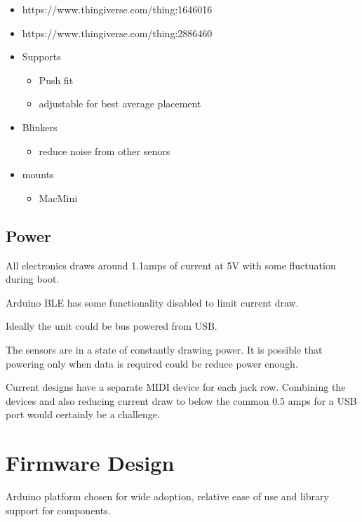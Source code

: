 \begin{itemize}
\item
  https://www.thingiverse.com/thing:1646016
\item
  https://www.thingiverse.com/thing:2886460
\item
  Supports

  \begin{itemize}
  \tightlist
  \item
    Push fit
  \item
    adjustable for best average placement
  \end{itemize}
\item
  Blinkers

  \begin{itemize}
  \tightlist
  \item
    reduce noise from other senors
  \end{itemize}
\item
  mounts

  \begin{itemize}
  \tightlist
  \item
    MacMini
  \end{itemize}
\end{itemize}

\subsection{Power}\label{power}

All electronics draws around 1.1amps of current at 5V with some
fluctuation during boot.

Arduino BLE has some functionality disabled to limit current draw.

Ideally the unit could be bus powered from USB.

The sensors are in a state of constantly drawing power. It is possible
that powering only when data is required could be reduce power enough.

Current designs have a separate MIDI device for each jack row. Combining
the devices and also reducing current draw to below the common 0.5 amps
for a USB port would certainly be a challenge.

\section{Firmware Design}\label{firmware-design}

Arduino platform chosen for wide adoption, relative ease of use and
library support for components.

